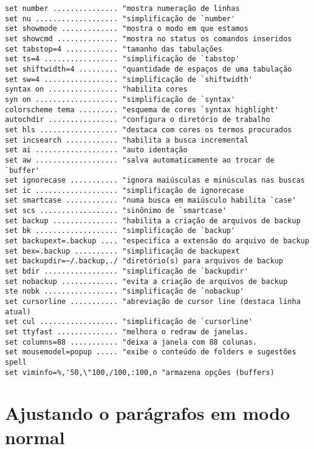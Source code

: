 \begin{verbatim}
set number ............... "mostra numeração de linhas
set nu ................... "simplificação de `number'
set showmode ............. "mostra o modo em que estamos
set showcmd .............. "mostra no status os comandos inseridos
set tabstop=4 ............ "tamanho das tabulações
set ts=4 ................. "simplificação de `tabstop'
set shiftwidth=4 ......... "quantidade de espaços de uma tabulação
set sw=4 ................. "simplificação de `shiftwidth'
syntax on ................ "habilita cores
syn on ................... "simplificação de `syntax'
colorscheme tema ......... "esquema de cores `syntax highlight'
autochdir ................ "configura o diretório de trabalho
set hls .................. "destaca com cores os termos procurados
set incsearch ............ "habilita a busca incremental
set ai ................... "auto identação
set aw ................... "salva automaticamente ao trocar de `buffer'
set ignorecase ........... "ignora maiúsculas e minúsculas nas buscas
set ic ................... "simplificação de ignorecase
set smartcase ............ "numa busca em maiúsculo habilita `case'
set scs .................. "sinônimo de `smartcase'
set backup ............... "habilita a criação de arquivos de backup
set bk ................... "simplificação de `backup'
set backupext=.backup .... "especifica a extensão do arquivo de backup
set bex=.backup .......... "simplificação de backupext
set backupdir=~/.backup,./ "diretório(s) para arquivos de backup
set bdir ................. "simplificação de `backupdir'
set nobackup ............. "evita a criação de arquivos de backup
ste nobk ................. "simplificação de `nobackup'
set cursorline ........... "abreviação de cursor line (destaca linha atual)
set cul .................. "simplificação de `cursorline'
set ttyfast .............. "melhora o redraw de janelas.
set columns=88 ........... "deixa a janela com 88 colunas.
set mousemodel=popup ..... "exibe o conteúdo de folders e sugestões spell
set viminfo=%,'50,\"100,/100,:100,n "armazena opções (buffers)
\end{verbatim}

\section{Ajustando o parágrafos em modo normal} %
\label{sec:Ajustando o parágrafos em modo normal}

